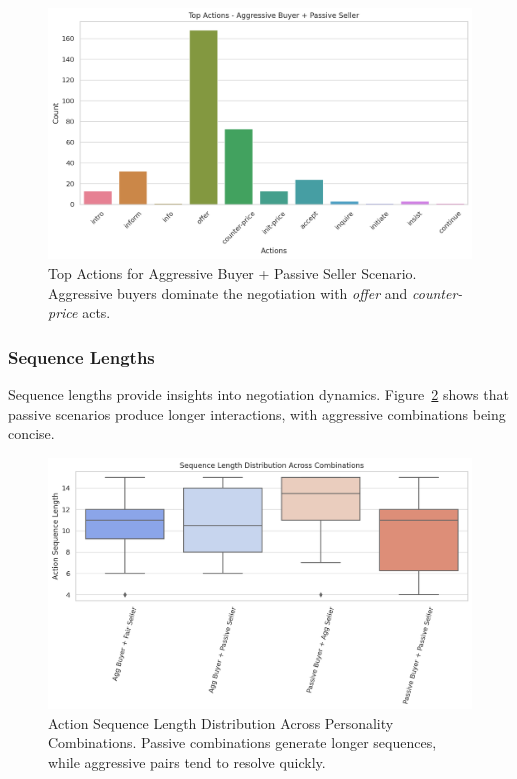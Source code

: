 \documentclass[11pt]{article}
\begin{document}
\begin{figure}[h]
    \centering
    \includegraphics[width=1\linewidth]{figures/personality/top_actions_aggressive_buyer_passive_seller.png}
    \caption{Top Actions for Aggressive Buyer + Passive Seller Scenario. Aggressive buyers dominate the negotiation with \textit{offer} and \textit{counter-price} acts.}
    \label{fig:top_actions_aggressive_passive}
\end{figure}

\subsubsection{Sequence Lengths}
Sequence lengths provide insights into negotiation dynamics. Figure~\ref{fig:sequence_lengths} shows that passive scenarios produce longer interactions, with aggressive combinations being concise.

\begin{figure}[h]
    \centering
    \includegraphics[width=1\linewidth]{figures/personality/sequence_lengths.png}
    \caption{Action Sequence Length Distribution Across Personality Combinations. Passive combinations generate longer sequences, while aggressive pairs tend to resolve quickly.}
    \label{fig:sequence_lengths}
\end{figure}
\end{document}

